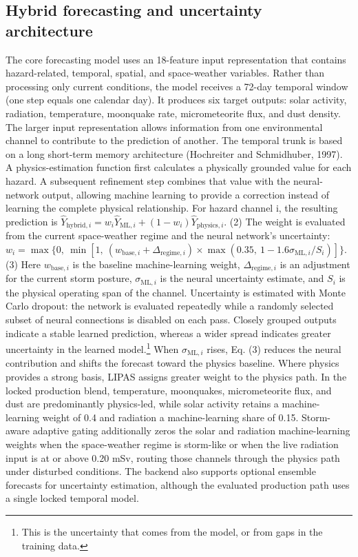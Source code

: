 \subsection{Hybrid forecasting and uncertainty architecture}

The core forecasting model uses an 18-feature input representation that contains hazard-related, temporal, spatial, and space-weather variables. Rather than processing only current conditions, the model receives a 72-day temporal window (one step equals one calendar day). It produces six target outputs: solar activity, radiation, temperature, moonquake rate, micrometeorite flux, and dust density. The larger input representation allows information from one environmental channel to contribute to the prediction of another. The temporal trunk is based on a long short-term memory architecture (Hochreiter and Schmidhuber, 1997). A physics-estimation function first calculates a physically grounded value for each hazard. A subsequent refinement step combines that value with the neural-network output, allowing machine learning to provide a correction instead of learning the complete physical relationship. For hazard channel i, the resulting prediction is $\hat{Y}_{\mathrm{hybrid},i} = w_i\hat{Y}_{\mathrm{ML},i} + (1-w_i)\hat{Y}_{\mathrm{physics},i}$. (2) The weight is evaluated from the current space-weather regime and the neural network's uncertainty: $w_i = \max\{0,\ \min[1,\ (w_{\mathrm{base},i}+\Delta_{\mathrm{regime},i})\times\max(0.35,\ 1-1.6\sigma_{\mathrm{ML},i}/S_i)]\}$. (3) Here $w_{\mathrm{base},i}$ is the baseline machine-learning weight, $\Delta_{\mathrm{regime},i}$ is an adjustment for the current storm posture, $\sigma_{\mathrm{ML},i}$ is the neural uncertainty estimate, and $S_i$ is the physical operating span of the channel. Uncertainty is estimated with Monte Carlo dropout: the network is evaluated repeatedly while a randomly selected subset of neural connections is disabled on each pass. Closely grouped outputs indicate a stable learned prediction, whereas a wider spread indicates greater uncertainty in the learned model.\footnote{This is the uncertainty that comes from the model, or from gaps in the training data.} When $\sigma_{\mathrm{ML},i}$ rises, Eq. (3) reduces the neural contribution and shifts the forecast toward the physics baseline. Where physics provides a strong basis, LIPAS assigns greater weight to the physics path. In the locked production blend, temperature, moonquakes, micrometeorite flux, and dust are predominantly physics-led, while solar activity retains a machine-learning weight of 0.4 and radiation a machine-learning share of 0.15. Storm-aware adaptive gating additionally zeros the solar and radiation machine-learning weights when the space-weather regime is storm-like or when the live radiation input is at or above 0.20 mSv, routing those channels through the physics path under disturbed conditions. The backend also supports optional ensemble forecasts for uncertainty estimation, although the evaluated production path uses a single locked temporal model.

